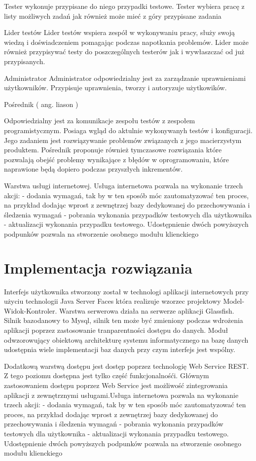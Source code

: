 Tester wykonuje przypisane do niego przypadki testowe. Tester wybiera pracę z listy możliwych zadań jak również może mieć z góry przypisane zadania

Lider testów
Lider testów wspiera zespół w wykonywaniu pracy, służy swoją wiedzą i doświadczeniem pomagając podczas napotkania problemów. Lider może również przypisywać testy do poszczególnych testerów jak i wywłaszczać od już przypisanych.

Administrator
Administrator odpowiedzialny jest za zarządzanie uprawnieniami użytkowników. Przypisuje uprawnienia, tworzy i autoryzuje użytkowików.

Pośrednik ( ang. liason )

Odpowiedzialny jest za komunikacje zespołu testów z zespołem programistycznym. Posiaga wgląd do aktulnie wykonywanyh testów i konfiguracji. Jego zadaniem jest rozwiązywanie problemów związanych z jego macierzystym produktem. Pośrednik proponuje również tymczasowe rozwiązania które pozwalają obejść problemy wynikające z błędów w oprogramowaniu, które naprawione będą dopiero podczas przyszłych inkrementów.

Warstwa usługi internetowej.
Usługa internetowa pozwala na wykonanie trzech akcji:
- dodania wymagań, tak by w ten sposób móc zautomatyzować ten proces, na przykład dodając wprost z zewnętrzej bazy dedykowanej do przechowywania i śledzenia wymagań
- pobrania wykonania przypadków testowych dla użytkownika
- aktualizacji wykonania przypadku testowego. Udostępnienie dwóch powyższych podpunków pozwala na stworzenie osobnego modułu klienckiego



\chapter{Implementacja rozwiązania}
Interfejs użytkownika stworzony został w technologi aplikacji internetowych przy użyciu technologii Java Server Faces która realizuje wzorzec projektowy  Model-Widok-Kontroler. Warstwa serwerowa działa na serwerze aplikacji Glassfish. Silnik bazodanowy to Mysql, silnik ten może być zmieniony podczas wdrożenia aplikacji poprzez zastosowanie tranparentności dostępu do danych. Moduł odwzorowujący obiektową architekturę systemu informatycznego na bazę danych udostępnia wiele implementacji baz danych przy czym interfejs jest wspólny.

Dodatkową warstwą dostępu jest dostęp poprzez technologię Web Service REST. Z tego poziomu dostępna jest tylko część funkcjonalnośći. Głównym zastosowaniem dostępu poprzez Web Service jest możliwość zintegrowania aplikacji z zewnętrznymi usługami.Usługa internetowa pozwala na wykonanie trzech akcji:
- dodania wymagań, tak by w ten sposób móc zautomatyzować ten proces, na przykład dodając wprost z zewnętrzej bazy dedykowanej do przechowywania i śledzenia wymagań
- pobrania wykonania przypadków testowych dla użytkownika
- aktualizacji wykonania przypadku testowego. Udostępnienie dwóch powyższych podpunków pozwala na stworzenie osobnego modułu klienckiego

